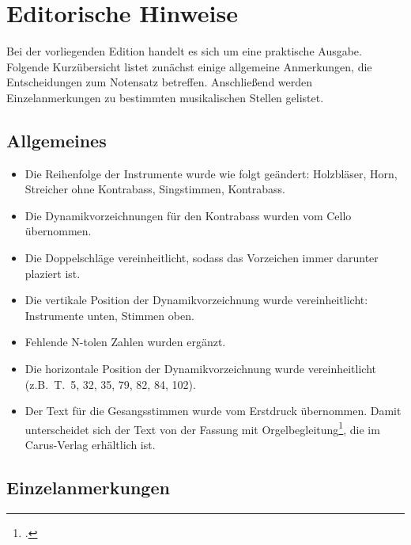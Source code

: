 \documentclass[paper=A3,12pt]{scrartcl}
\begin{document}
\section{Editorische Hinweise}

Bei der vorliegenden Edition handelt es sich um eine praktische Ausgabe.
Folgende Kurzübersicht listet zunächst einige allgemeine Anmerkungen, die Entscheidungen zum Notensatz betreffen.
Anschließend werden Einzelanmerkungen zu bestimmten musikalischen Stellen gelistet.

\subsection{Allgemeines}

\begin{itemize}
  \setlength\itemsep{0.25\baselineskip}
  \item Die Reihenfolge der Instrumente wurde wie folgt geändert: Holzbläser, Horn, Streicher ohne Kontrabass, Singstimmen, Kontrabass.
  \item Die Dynamikvorzeichnungen für den Kontrabass wurden vom Cello übernommen.
  \item Die Doppelschläge vereinheitlicht, sodass das Vorzeichen immer darunter plaziert ist.
  \item Die vertikale Position der Dynamikvorzeichnung wurde vereinheitlicht: Instrumente unten, Stimmen oben.
  \item Fehlende N-tolen Zahlen wurden ergänzt.
  \item Die horizontale Position der Dynamikvorzeichnung wurde vereinheitlicht (z.B.\ T.\ 5, 32, 35, 79, 82, 84, 102).
  \item Der Text für die Gesangsstimmen wurde vom Erstdruck übernommen. Damit unterscheidet sich der Text von der Fassung mit Orgelbegleitung\footcite{2018_Schumacher_AgnusDei_Carus}, die im Carus-Verlag erhältlich ist.
\end{itemize}

\subsection{Einzelanmerkungen}
\end{document}
